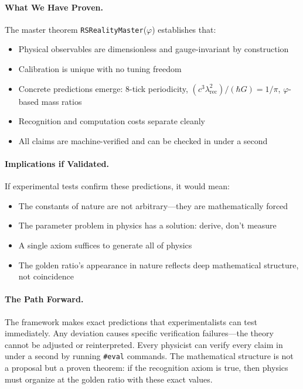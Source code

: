 \documentclass[11pt,a4paper,twoside]{article}
\numberwithin{equation}{section}
\theoremstyle{customthm}
\theoremstyle{customdef}
\theoremstyle{customrem}
\begin{document}
\paragraph{What We Have Proven.} The master theorem \texttt{RSRealityMaster}($\varphi$) establishes that:
\begin{itemize}[leftmargin=*,topsep=2pt,itemsep=2pt]
\item Physical observables are dimensionless and gauge-invariant by construction
\item Calibration is unique with no tuning freedom
\item Concrete predictions emerge: 8-tick periodicity, $(c^3\lambda_{\mathrm{rec}}^2)/(\hbar G) = 1/\pi$, $\varphi$-based mass ratios
\item Recognition and computation costs separate cleanly
\item All claims are machine-verified and can be checked in under a second
\end{itemize}

\paragraph{Implications if Validated.} If experimental tests confirm these predictions, it would mean:
\begin{itemize}[leftmargin=*,topsep=2pt,itemsep=2pt]
\item The constants of nature are not arbitrary—they are mathematically forced
\item The parameter problem in physics has a solution: derive, don't measure
\item A single axiom suffices to generate all of physics
\item The golden ratio's appearance in nature reflects deep mathematical structure, not coincidence
\end{itemize}

\paragraph{The Path Forward.} The framework makes exact predictions that experimentalists can test immediately. Any deviation causes specific verification failures—the theory cannot be adjusted or reinterpreted. Every physicist can verify every claim in under a second by running \texttt{\#eval} commands. The mathematical structure is not a proposal but a proven theorem: if the recognition axiom is true, then physics must organize at the golden ratio with these exact values.
\end{document}
